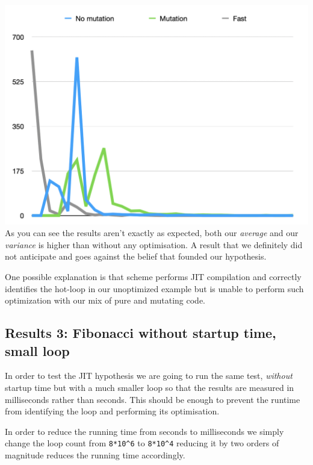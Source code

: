 \documentclass[
]{article}
\begin{document}
\includegraphics{Screenshot 2020-08-25 at 17.59.34.png} As you can see
the results aren't exactly as expected, both our \emph{average} and our
\emph{variance} is higher than without any optimisation. A result that
we definitely did not anticipate and goes against the belief that
founded our hypothesis.

One possible explanation is that scheme performs JIT compilation and
correctly identifies the hot-loop in our unoptimized example but is
unable to perform such optimization with our mix of pure and mutating
code.

\hypertarget{results-3-fibonacci-without-startup-time-small-loop}{%
\subsection{Results 3: Fibonacci without startup time, small
loop}\label{results-3-fibonacci-without-startup-time-small-loop}}

In order to test the JIT hypothesis we are going to run the same test,
\emph{without} startup time but with a much smaller loop so that the
results are measured in milliseconds rather than seconds. This should be
enough to prevent the runtime from identifying the loop and performing
its optimisation.

In order to reduce the running time from seconds to milliseconds we
simply change the loop count from \texttt{8*10\^{}6} to
\texttt{8*10\^{}4} reducing it by two orders of magnitude reduces the
running time accordingly.
\end{document}
